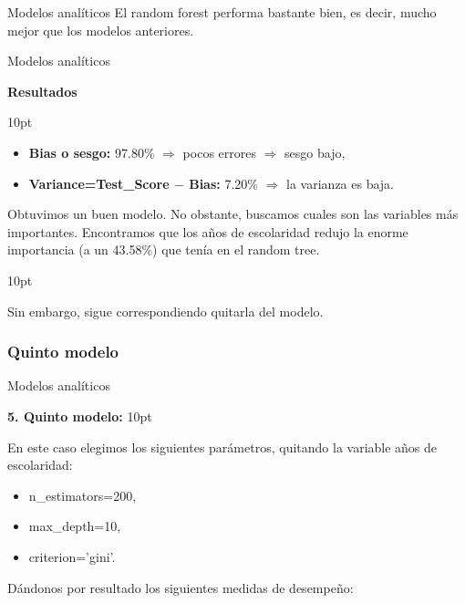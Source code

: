\documentclass[pdf]{beamer}
\def\vspace{}%
\begin{document}
{\begin{frame}{Modelos analíticos}
    El random forest performa bastante bien, es decir, mucho mejor que los modelos anteriores.

\end{frame}

\begin{frame}{Modelos analíticos}

    \begin{large}
        \textbf{Resultados}
    \end{large}
    \vspace{10pt}    
    
    \begin{itemize}
        \item \textbf{Bias o sesgo:} 97.80\% $\Rightarrow$ pocos errores $\Rightarrow$ sesgo bajo,
        \item \textbf{Variance=Test\_Score $-$ Bias:} 7.20\% $\Rightarrow$ la varianza es baja.
    \end{itemize}
    
    Obtuvimos un buen modelo. No obstante, buscamos cuales son las variables más importantes. Encontramos que los años de escolaridad redujo la enorme importancia (a un 43.58\%) que tenía en el random tree. 
    
    \vspace{10pt}
    
    Sin embargo, sigue correspondiendo quitarla del modelo.

\end{frame}

\subsubsection{Quinto modelo}

\begin{frame}{Modelos analíticos}

    \textbf{\Large 5. Quinto modelo:}
    \vspace{10pt}

    En este caso elegimos los siguientes parámetros, quitando la variable años de escolaridad:
    \begin{itemize}
        \item n\_estimators=200,
        \item max\_depth=10,
        \item criterion='gini'.
    \end{itemize}
    
    Dándonos por resultado los siguientes medidas de desempeño:
    

\end{frame}}
\end{document}
